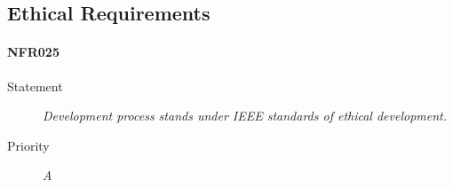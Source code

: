 \subsection{Ethical Requirements}

\paragraph{NFR025}
\begin{description}
\item[Statement] \textit{Development process stands under IEEE standards of
    ethical development.}
\item[Priority] \textit{A}
\end{description}